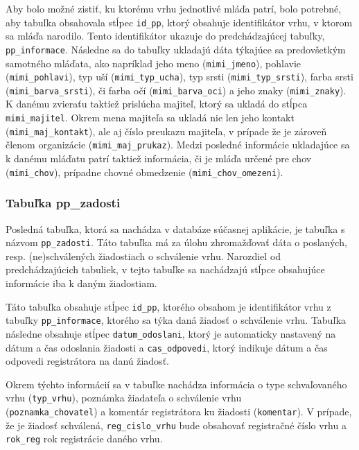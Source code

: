 Aby bolo možné zistiť, ku ktorému vrhu jednotlivé mláďa patrí, bolo potrebné, aby tabuľka obsahovala stĺpec \texttt{id_pp}, ktorý obsahuje identifikátor vrhu, v ktorom sa mláďa narodilo. Tento identifikátor ukazuje do predchádzajúcej tabuľky,  \texttt{pp_informace}. Následne sa do tabuľky ukladajú dáta týkajúce sa predovšetkým samotného mláďata, ako napríklad jeho meno (\texttt{mimi_jmeno}), pohlavie (\texttt{mimi_pohlavi}), typ uší (\texttt{mimi_typ_ucha}), typ srsti (\texttt{mimi_typ_srsti}), farba srsti (\texttt{mimi_barva_srsti}), či farba očí (\texttt{mimi_barva_oci}) a jeho znaky (\texttt{mimi_znaky}). K danému zvieraťu taktiež prislúcha majiteľ, ktorý sa ukladá do stĺpca \texttt{mimi_majitel}. Okrem mena majiteľa sa ukladá nie len jeho kontakt (\texttt{mimi_maj_kontakt}), ale aj číslo preukazu majiteľa, v prípade že je zároveň členom organizácie (\texttt{mimi_maj_prukaz}). Medzi posledné informácie ukladajúce sa k danému mláďatu patrí taktiež informácia, či je mláďa určené pre chov (\texttt{mimi_chov}), prípadne chovné obmedzenie (\texttt{mimi_chov_omezeni}).

\subsubsection*{Tabuľka pp\_zadosti}

Posledná tabuľka, ktorá sa nachádza v databáze súčasnej aplikácie, je tabuľka s názvom \texttt{pp_zadosti}.
Táto tabuľka má za úlohu zhromažďovať dáta o poslaných, resp. (ne)schválených žiadostiach o schválenie vrhu. 
Narozdiel od predchádzajúcich tabuliek, v tejto tabuľke sa nachádzajú stĺpce obsahujúce informácie iba k daným žiadostiam.

Táto tabuľka obsahuje stĺpec \texttt{id_pp}, ktorého obsahom je identifikátor vrhu z tabuľky \texttt{pp_informace}, ktorého sa týka daná žiadosť o schválenie vrhu. Tabuľka následne obsahuje stĺpec \texttt{datum_odoslani}, ktorý je automaticky nastavený na dátum a čas odoslania žiadosti a \texttt{cas_odpovedi}, ktorý indikuje dátum a čas odpovedi registrátora na danú žiadosť.

Okrem týchto informácií sa v tabuľke nachádza informácia o type schvaľovaného vrhu (\texttt{typ_vrhu}), poznámka žiadateľa o schválenie vrhu \\ (\texttt{poznamka_chovatel}) a komentár registrátora ku žiadosti (\texttt{komentar}). V prípade, že je žiadosť schválená, \texttt{reg_cislo_vrhu} bude obsahovať registračné číslo vrhu a \texttt{rok_reg} rok registrácie daného vrhu.

